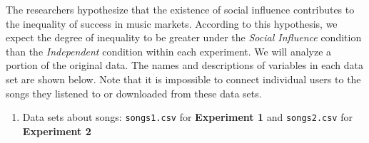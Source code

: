 \documentclass[]{article}
\begin{document}
The researchers hypothesize that the existence of social influence
contributes to the inequality of success in music markets. According to
this hypothesis, we expect the degree of inequality to be greater under
the \emph{Social Influence} condition than the \emph{Independent}
condition within each experiment. We will analyze a portion of the
original data. The names and descriptions of variables in each data set
are shown below. Note that it is impossible to connect individual users
to the songs they listened to or downloaded from these data sets.

\begin{enumerate}
\def\labelenumi{\arabic{enumi}.}
\itemsep1pt\parskip0pt
\item
  Data sets about songs: \texttt{songs1.csv} for \textbf{Experiment 1}
  and \texttt{songs2.csv} for \textbf{Experiment 2}
\end{enumerate}
\end{document}
